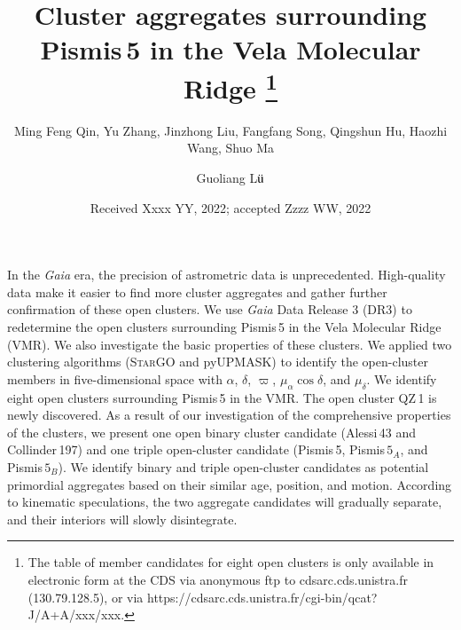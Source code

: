 \documentclass{aa} %
\begin{document}
 


   \title{Cluster aggregates surrounding Pismis\,5 in the Vela Molecular Ridge \thanks{The table of member candidates for eight open clusters is only available in electronic form at the CDS via anonymous ftp to cdsarc.cds.unistra.fr (130.79.128.5), or via https://cdsarc.cds.unistra.fr/cgi-bin/qcat?J/A+A/xxx/xxx.}} 

   \subtitle{}

   \author{Ming Feng Qin,
   Yu Zhang,
   Jinzhong Liu,
   Fangfang Song,
   Qingshun Hu,
   Haozhi Wang,
   Shuo Ma
   \and
   Guoliang L$\rm{\ddot{u}}$
          }


   \date{Received Xxxx YY, 2022; accepted Zzzz WW, 2022}
 
  \abstract
{In the {\it Gaia} era, the precision of astrometric data is unprecedented. High-quality data make it easier to find more cluster aggregates and gather further confirmation of these 
open clusters.}   
  {We use {\it Gaia} Data Release 3 (DR3) to redetermine the open clusters surrounding Pismis\,5 
  in the Vela Molecular Ridge (VMR). We also investigate the basic properties of these
  clusters.}
  {We applied two clustering algorithms (\textsc{StarGO} and pyUPMASK) to identify the open-cluster members in five-dimensional space with $\alpha$, $\delta$, $\varpi$, $\mu_\alpha \cos\delta$, 
  and $\mu_\delta$.}
  {We identify eight open clusters surrounding Pismis\,5 in the VMR. The open cluster QZ\,1 is newly discovered.
  As a result of our investigation of the comprehensive properties of the clusters, we present one open binary cluster candidate (Alessi\,43 and Collinder\,197)
  and one triple open-cluster candidate (Pismis\,5, Pismis$\,5_{A}$, and Pismis$\,5_{B}$).}
  {We identify binary and triple open-cluster candidates as potential primordial aggregates based on their similar age, position, and motion. According to kinematic speculations, the two aggregate candidates will gradually separate, and their interiors will slowly disintegrate.}
\end{document}

